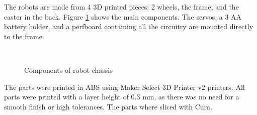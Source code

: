 \documentclass[]{article}
\begin{document}
The robots are made from 4 3D printed pieces: 2 wheels, the frame, and
the caster in the back.
Figure \ref{fig:robotchassis} shows the main components.
The servos, a 3 AA battery holder, and a perfboard containing all the circuitry are mounted directly to the frame.

\begin{figure}
  \centering
  \\
  \caption{Components of robot chassis}
  \label{fig:robotchassis}
\end{figure}

The parts were printed in ABS using Maker Select 3D Printer v2 printers.
All parts were printed with a layer height of 0.3 mm, as there was no need for a smooth finish or high tolerances.
The parts where sliced with Cura.
\end{document}
